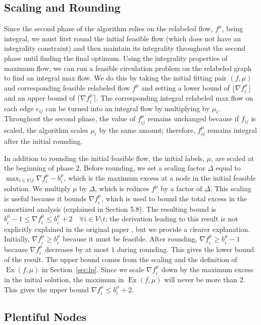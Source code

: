 \documentclass[12pt]{article}
\theoremstyle{definition}
\newcommand{\fu}{f^{\mu}}
\newcommand{\nfiu}{\nabla \fu_i}
\newcommand{\biu}{b_{i}^{\mu}}
\DeclareMathOperator{\Ex}{Ex}
\begin{document}
    \subsection{Scaling and Rounding} 
    Since the second phase of the algorithm relies on the relabeled flow, $f^\mu$, being integral, we must first round the initial feasible flow (which does not have an integrality constraint) and then maintain its integrality throughout the second phase until finding the final optimum. Using the integrality properties of maximum flow, we can run a feasible circulation problem on the relabeled graph to find an integral max flow. We do this by taking the initial fitting pair $(f, \mu)$ and corresponding feasible relabeled flow $f^\mu$ and setting a lower bound of $\lfloor \nabla f_i^\mu \rfloor$ and an upper bound of $\lceil \nabla f_i^\mu \rceil$. The corresponding integral relabeled max flow on each edge $e_{ij}$ can be turned into an integral flow by multiplying by $\mu_i$. Throughout the second phase, the value of $f_{ij}^\mu$ remains unchanged because if $f_{ij}$ is scaled, the algorithm scales $\mu_i$ by the same amount; therefore, $f_{ij}^\mu$ remains integral after the initial rounding.
    
    In addition to rounding the initial feasible flow, the initial labels, $\mu$, are scaled at the beginning of phase 2. Before rounding, we set a scaling factor $\Delta$ equal to $\max_{i \in V \setminus t} \nfiu - \biu$, which is the maximum excess at a node in the initial feasible solution. We multiply $\mu$ by $\Delta$, which is reduces $f^\mu$ by a factor of $\Delta$. This scaling is useful because it bounds $\nfiu$, which is used to bound the total excess in the amortized analysis (explained in Section 5.8). The resulting bound is $\biu - 1 \leq \nfiu \leq \biu + 2 \quad \forall i \in V \setminus t $; the derivation leading to this result is not explicitly explained in the original paper \cite{Olver2017}, but we provide a clearer explanation. Initially, $\nfiu \geq \biu$ because it must be feasible. After rounding, $\nfiu \geq \biu - 1$ because $\nfiu$ decreases by at most $1$ during rounding. This gives the lower bound of the result. The upper bound comes from the scaling and the definition of $\Ex(f, \mu)$ in Section~\ref{sec:lp}. Since we scale $\nfiu$ down by the maximum excess in the initial solution, the maximum in $\Ex(f,\mu)$ will never be more than $2$. This gives the upper bound $\nfiu \leq \biu + 2$. 

\subsection{Plentiful Nodes}
\end{document}
